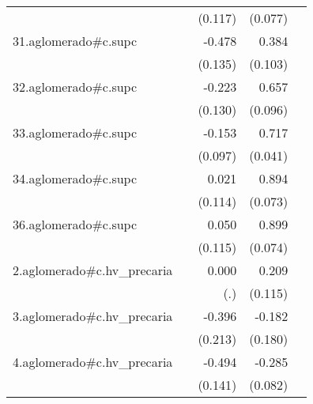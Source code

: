 {\begin{longtable}{l*{4}{D{.}{.}{-1}}}
            &                     &     (0.117)         &     (0.077)         &                     \\
\addlinespace
31.aglomerado#c.supc&                     &      -0.478\sym{***}&       0.384\sym{***}&                     \\
            &                     &     (0.135)         &     (0.103)         &                     \\
\addlinespace
32.aglomerado#c.supc&                     &      -0.223         &       0.657\sym{***}&                     \\
            &                     &     (0.130)         &     (0.096)         &                     \\
\addlinespace
33.aglomerado#c.supc&                     &      -0.153         &       0.717\sym{***}&                     \\
            &                     &     (0.097)         &     (0.041)         &                     \\
\addlinespace
34.aglomerado#c.supc&                     &       0.021         &       0.894\sym{***}&                     \\
            &                     &     (0.114)         &     (0.073)         &                     \\
\addlinespace
36.aglomerado#c.supc&                     &       0.050         &       0.899\sym{***}&                     \\
            &                     &     (0.115)         &     (0.074)         &                     \\
\addlinespace
2.aglomerado#c.hv\_precaria&                     &       0.000         &       0.209         &                     \\
            &                     &         (.)         &     (0.115)         &                     \\
\addlinespace
3.aglomerado#c.hv\_precaria&                     &      -0.396         &      -0.182         &                     \\
            &                     &     (0.213)         &     (0.180)         &                     \\
\addlinespace
4.aglomerado#c.hv\_precaria&                     &      -0.494\sym{***}&      -0.285\sym{***}&                     \\
            &                     &     (0.141)         &     (0.082)         &                     \\

\end{longtable}}
